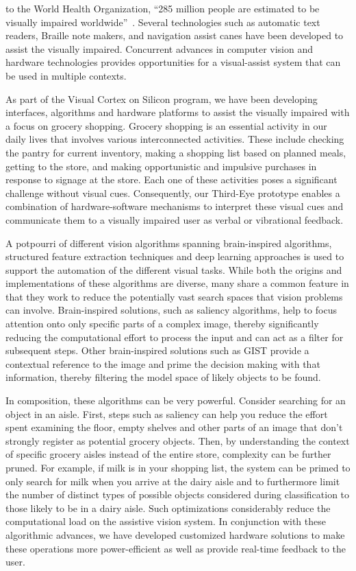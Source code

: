 to the World Health Organization, ``285 million people are estimated
to be visually impaired worldwide''~\cite{WHO}.
Several technologies such as automatic text readers, Braille note
makers, and navigation assist canes have been developed to assist the
visually impaired. Concurrent advances in computer vision and hardware
technologies provides opportunities for a visual-assist system that
can be used in multiple contexts.

As part of the Visual Cortex on Silicon program, we have been
developing interfaces, algorithms and hardware platforms to assist the
visually impaired with a focus on grocery shopping. Grocery shopping
is an essential activity in our daily lives that involves various
interconnected activities. These include checking the pantry for
current inventory, making a shopping list based on planned meals,
getting to the store, and making opportunistic and impulsive purchases
in response to signage at the store. Each one of these activities
poses a significant challenge without visual cues.  Consequently, our
Third-Eye prototype enables a combination of hardware-software
mechanisms to interpret these visual cues and communicate them to a
visually impaired user as verbal or vibrational feedback.

A potpourri of different vision algorithms spanning brain-inspired
algorithms, structured feature extraction techniques and deep learning
approaches is used to support the automation of the different visual
tasks. While both the origins and implementations of these algorithms
are diverse, many share a common feature in that they work to reduce
the potentially vast search spaces that vision problems can
involve. Brain-inspired solutions, such as saliency algorithms, help
to focus attention onto only specific parts of a complex image,
thereby significantly reducing the computational effort to process the
input and can act as a filter for subsequent steps.  Other
brain-inspired solutions such as GIST provide a contextual reference
to the image and prime the decision making with that information,
thereby filtering the model space of likely objects to be found.

In composition, these algorithms can be very powerful. Consider
searching for an object in an aisle. First, steps such as saliency can
help you reduce the effort spent examining the floor, empty shelves
and other parts of an image that don't strongly register as potential
grocery objects. Then, by understanding the context of specific
grocery aisles instead of the entire store, complexity can be further
pruned.  For example, if milk is in your shopping list, the system can
be primed to only search for milk when you arrive at the dairy aisle
and to furthermore limit the number of distinct types of possible
objects considered during classification to those likely to be in a
dairy aisle. Such optimizations considerably reduce the computational
load on the assistive vision system. In conjunction with these
algorithmic advances, we have developed customized hardware solutions
to make these operations more power-efficient as well as provide
real-time feedback to the user.


